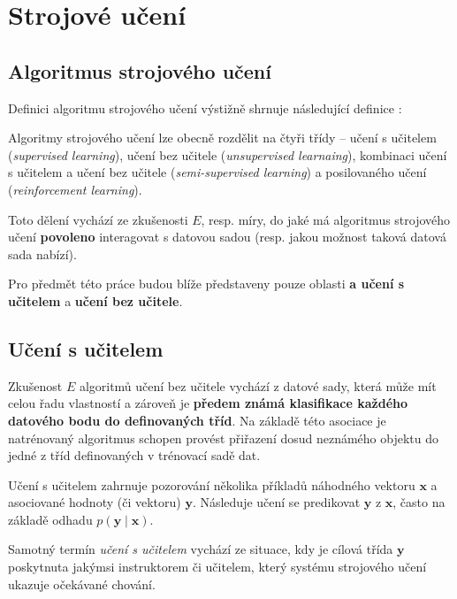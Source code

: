 \section{Strojové učení}
\subsection{Algoritmus strojového učení}
\label{sec:machine_learning_algorithm}
Definici algoritmu strojového učení výstižně shrnuje následující definice \cite[str. 2]{Mitchell1997}:
\begin{displayquote}
\end{displayquote}
Algoritmy strojového učení lze obecně rozdělit na čtyři třídy – učení s učitelem (\emph{supervised learning}),
učení bez učitele (\emph{unsupervised learnaing}), kombinaci učení s učitelem a učení bez učitele (\emph{semi-supervised learning}) a posilovaného učení (\emph{reinforcement learning}).

Toto dělení vychází ze zkušenosti $E$, resp. míry, do jaké má algoritmus strojového učení \textbf{povoleno} interagovat s datovou sadou (resp. jakou možnost taková datová sada nabízí). \cite{Goodfellow2016}

Pro předmět této práce budou blíže představeny pouze oblasti \textbf{a učení s učitelem} a \textbf{učení bez učitele}.
\subsection{Učení s učitelem}
\label{sec:supervised_learning}
Zkušenost $E$ algoritmů učení bez učitele vychází z datové sady, která může mít celou řadu vlastností a zároveň je \textbf{předem známá klasifikace každého datového bodu do definovaných tříd}.
Na základě této asociace je natrénovaný algoritmus schopen provést přiřazení dosud neznámého objektu do jedné z tříd definovaných v trénovací sadě dat.

Učení s učitelem zahrnuje pozorování několika příkladů náhodného vektoru $\mathbf{x}$ a asociované hodnoty (či vektoru) $\mathbf{y}$.
Následuje učení se predikovat $\mathbf{y}$ z $\mathbf{x}$, často na základě odhadu $p(\mathbf{y}\mid\mathbf{x})$.

Samotný termín \emph{učení s učitelem} vychází ze situace, kdy je cílová třída $\mathbf{y}$ poskytnuta jakýmsi instruktorem či učitelem, který systému strojového učení ukazuje očekávané chování. \cite{Goodfellow2016}
